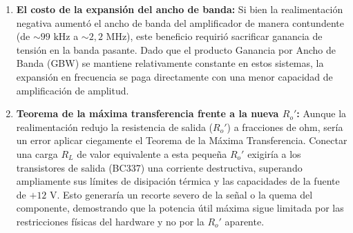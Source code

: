 \begin{enumerate}
    \item \textbf{El costo de la expansión del ancho de banda:} Si bien la realimentación negativa aumentó el ancho de banda del amplificador de manera contundente (de $\sim 99\text{ kHz}$ a $\sim 2,2\text{ MHz}$), este beneficio requirió sacrificar ganancia de tensión en la banda pasante. Dado que el producto Ganancia por Ancho de Banda (GBW) se mantiene relativamente constante en estos sistemas, la expansión en frecuencia se paga directamente con una menor capacidad de amplificación de amplitud.
\item \textbf{Teorema de la máxima transferencia frente a la nueva $R_o'$:} Aunque la realimentación redujo la resistencia de salida ($R_o'$) a fracciones de ohm, sería un error aplicar ciegamente el Teorema de la Máxima Transferencia. Conectar una carga $R_L$ de valor equivalente a esta pequeña $R_o'$ exigiría a los transistores de salida (BC337) una corriente destructiva, superando ampliamente sus límites de disipación térmica y las capacidades de la fuente de $+12\text{ V}$. Esto generaría un recorte severo de la señal o la quema del componente, demostrando que la potencia útil máxima sigue limitada por las restricciones físicas del hardware y no por la $R_o'$ aparente.
\end{enumerate}